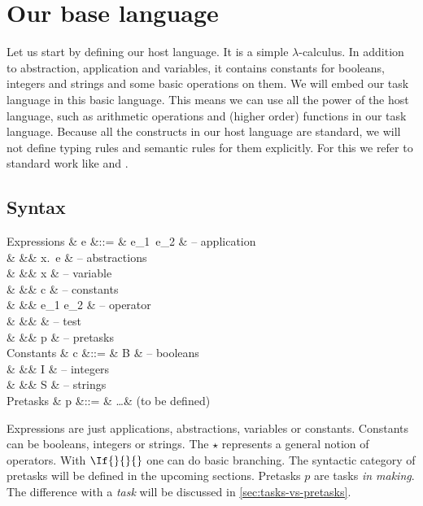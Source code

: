 
\section{Our base language}

Let us start by defining our host language.
It is a simple $\lambda$-calculus.
In addition to abstraction, application and variables,
it contains constants for booleans, integers and strings
and some basic operations on them.
We will embed our task language in this basic language.
This means we can use all the power of the host language,
such as arithmetic operations and (higher order) functions in our task language.
Because all the constructs in our host language are standard,
we will not define typing rules and semantic rules for them explicitly.
For this we refer to standard work like \textcite{pierce2002types} and \textcite{harper2016practical}.


\subsection{Syntax}

\begin{grammar}
  Expressions
    & e &::= & e_1\ e_2           & – application \\
    &   &\mid& \lambda x.\ e      & – abstractions \\
    &   &\mid& x                  & – variable \\
    &   &\mid& c                  & – constants \\
    &   &\mid& e_1 \star e_2      & – operator \\
    &   &\mid&  & – test \\
    &   &\mid& p                  & – pretasks \\
  Constants
    & c &::= & B                  & – booleans \\
    &   &\mid& I                  & – integers \\
    &   &\mid& S                  & – strings \\
  Pretasks
    & p &::= & \ldots             & (to be defined) \\
\end{grammar}
Expressions are just applications, abstractions, variables or constants.
Constants can be booleans, integers or strings.
The $\star$ represents a general notion of operators.
With $\If{}{}{}$ one can do basic branching.
The syntactic category of pretasks will be defined in the upcoming sections.
Pretasks $p$ are tasks \emph{in making}.
The difference with a \emph{task} will be discussed in \autoref{sec:tasks-vs-pretasks}.

